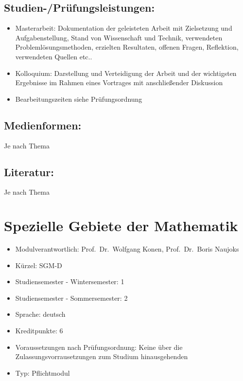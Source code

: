 \section*{Studien-/Prüfungsleistungen:}\label{studien-pruxfcfungsleistungen-1}

\begin{itemize}
\tightlist
\item
  Masterarbeit: Dokumentation der geleisteten Arbeit mit Zielsetzung und
  Aufgabenstellung, Stand von Wissenschaft und Technik, verwendeten
  Problemlösungsmethoden, erzielten Resultaten, offenen Fragen,
  Reflektion, verwendeten Quellen etc..
\item
  Kolloquium: Darstellung und Verteidigung der Arbeit und der
  wichtigsten Ergebnisse im Rahmen eines Vortrages mit anschließender
  Diskussion
\item
  Bearbeitungszeiten siehe Prüfungsordnung
\end{itemize}

\section*{Medienformen:}\label{medienformen-1}

Je nach Thema

\section*{Literatur:}\label{literatur-1}

Je nach Thema

\chapter{Spezielle Gebiete der
Mathematik}\label{spezielle-gebiete-der-mathematik}

\begin{itemize}
\tightlist
\item
  Modulverantwortlich: Prof.~Dr.~Wolfgang Konen, Prof.~Dr.~Boris Naujoks
\item
  Kürzel: SGM-D
\item
  Studiensemester - Wintersemester: 1
\item
  Studiensemester - Sommersemester: 2
\item
  Sprache: deutsch
\item
  Kreditpunkte: 6
\item
  Voraussetzungen nach Prüfungsordnung: Keine über die
  Zulassungsvorrausetzungen zum Studium hinausgehenden
\item
  Typ: Pflichtmodul
\end{itemize}

